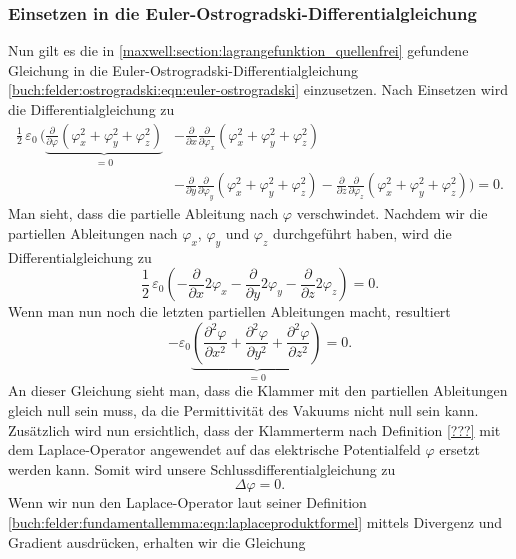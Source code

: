 \subsubsection{Einsetzen in die Euler-Ostrogradski-Differentialgleichung}
Nun gilt es die in \eqref{maxwell:section:lagrangefunktion_quellenfrei} gefundene Gleichung in die Euler-Ostrogradski-Differentialgleichung \eqref{buch:felder:ostrogradski:eqn:euler-ostrogradski} einzusetzen.
Nach Einsetzen wird die Differentialgleichung zu
\begin{align*}
\frac{1}{2}\,\varepsilon_0\,\biggl(\underbrace{\frac{\partial}{\partial\varphi}\left(\varphi_x^2 + \varphi_y^2 + \varphi_z^2\right)}_{\displaystyle=0} &- \frac{\partial}{\partial x}\frac{\partial}{\partial \varphi_x}\left(\varphi_x^2 + \varphi_y^2 + \varphi_z^2\right)\\
&- \frac{\partial}{\partial y}\frac{\partial}{\partial \varphi_y}\left(\varphi_x^2 + \varphi_y^2 + \varphi_z^2\right) - 
\frac{\partial}{\partial z}\frac{\partial}{\partial \varphi_z}\left(\varphi_x^2 + \varphi_y^2 + \varphi_z^2\right)\biggr)
=
0.
\end{align*}
Man sieht, dass die partielle Ableitung nach $\varphi$ verschwindet.
Nachdem wir die partiellen Ableitungen nach $\varphi_x$, $\varphi_y$ und $\varphi_z$ durchgeführt haben, wird die Differentialgleichung zu
\[
\frac{1}{2}\,\varepsilon_0\left(-\frac{\partial}{\partial x}2\varphi_x - \frac{\partial}{\partial y}2\varphi_y - \frac{\partial}{\partial z}2\varphi_z\right)
=
0.
\]
Wenn man nun noch die letzten partiellen Ableitungen macht, resultiert
\begin{equation}
	- \varepsilon_0\underbrace{\left(\frac{\partial^2\varphi}{\partial x^2} + \frac{\partial^2\varphi}{\partial y^2} + \frac{\partial^2\varphi}{\partial z^2}\right)}_{\displaystyle=0}
	=
	0.
	\label{maxwell:section:laplace_gleichung_1}
\end{equation}
An dieser Gleichung sieht man, dass die Klammer mit den partiellen Ableitungen gleich null sein muss, da die Permittivität des Vakuums nicht null sein kann.
Zusätzlich wird nun ersichtlich, dass der Klammerterm nach Definition \eqref{???} mit dem Laplace-Operator angewendet auf das elektrische Potentialfeld $\varphi$ ersetzt werden kann.
Somit wird unsere Schlussdifferentialgleichung zu
\begin{equation}
	\Delta\varphi
	=
	0.
	\label{maxwell:section:laplace_gleichung_2}
\end{equation}
Wenn wir nun den Laplace-Operator laut seiner Definition \eqref{buch:felder:fundamentallemma:eqn:laplaceproduktformel} mittels Divergenz und Gradient ausdrücken, erhalten wir die Gleichung
